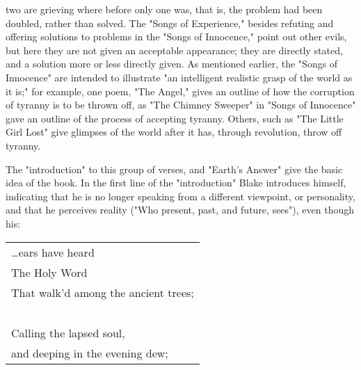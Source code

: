 two are grieving where before only one was, that is, the problem had been doubled, rather than solved. The "Songs of Experience,"
besides refuting and offering solutions to problems in the "Songs of Innocence," point out other evils, but here they are not given an
acceptable appearance; they are directly stated, and a solution more or less directly given. As mentioned earlier, the "Songs of Innocence" are
intended to illustrate "an intelligent realistic grasp of the world as it is;" for example, one poem, "The Angel," gives an
outline of how the corruption of tyranny is to be thrown off, as "The Chimney Sweeper" in "Songs of Innocence" gave an outline of the
process of accepting tyranny. Others, such as "The Little Girl Lost" give glimpses of the world after it has, through revolution, throw off tyranny.\par
\vspace*{0.5\baselineskip}
The "introduction" to this group of verses, and "Earth's Answer" give the basic idea of the book. In the first line of the "introduction" Blake
introduces himself, indicating that he is no longer speaking from a different viewpoint, or personality, and that he perceives reality
("Who present, past, and future, sees"), even though his:\par
\begin{center}
	\begin{tabular}{l}
		\dots ears have heard                \\
		The Holy Word                        \\
		That walk'd among the ancient trees; \\
		~                                    \\
		Calling the lapsed soul,             \\
		and deeping in the evening dew;
	\end{tabular}
\end{center}

